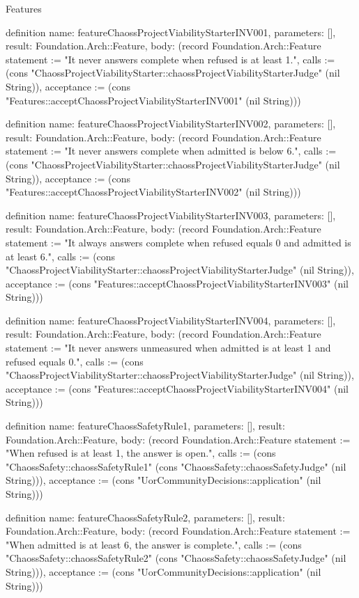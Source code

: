\begin{lexlean}{Features}
\begin{semanticmodule}
definition{
  name: featureChaossProjectViabilityStarterINV001,
  parameters: [],
  result: Foundation.Arch::Feature,
  body: (record Foundation.Arch::Feature {statement := "It never answers complete when refused is at least 1.", calls := (cons "ChaossProjectViabilityStarter::chaossProjectViabilityStarterJudge" (nil String)), acceptance := (cons "Features::acceptChaossProjectViabilityStarterINV001" (nil String))})
}

definition{
  name: featureChaossProjectViabilityStarterINV002,
  parameters: [],
  result: Foundation.Arch::Feature,
  body: (record Foundation.Arch::Feature {statement := "It never answers complete when admitted is below 6.", calls := (cons "ChaossProjectViabilityStarter::chaossProjectViabilityStarterJudge" (nil String)), acceptance := (cons "Features::acceptChaossProjectViabilityStarterINV002" (nil String))})
}

definition{
  name: featureChaossProjectViabilityStarterINV003,
  parameters: [],
  result: Foundation.Arch::Feature,
  body: (record Foundation.Arch::Feature {statement := "It always answers complete when refused equals 0 and admitted is at least 6.", calls := (cons "ChaossProjectViabilityStarter::chaossProjectViabilityStarterJudge" (nil String)), acceptance := (cons "Features::acceptChaossProjectViabilityStarterINV003" (nil String))})
}

definition{
  name: featureChaossProjectViabilityStarterINV004,
  parameters: [],
  result: Foundation.Arch::Feature,
  body: (record Foundation.Arch::Feature {statement := "It never answers unmeasured when admitted is at least 1 and refused equals 0.", calls := (cons "ChaossProjectViabilityStarter::chaossProjectViabilityStarterJudge" (nil String)), acceptance := (cons "Features::acceptChaossProjectViabilityStarterINV004" (nil String))})
}

definition{
  name: featureChaossSafetyRule1,
  parameters: [],
  result: Foundation.Arch::Feature,
  body: (record Foundation.Arch::Feature {statement := "When refused is at least 1, the answer is open.", calls := (cons "ChaossSafety::chaossSafetyRule1" (cons "ChaossSafety::chaossSafetyJudge" (nil String))), acceptance := (cons "UorCommunityDecisions::application" (nil String))})
}

definition{
  name: featureChaossSafetyRule2,
  parameters: [],
  result: Foundation.Arch::Feature,
  body: (record Foundation.Arch::Feature {statement := "When admitted is at least 6, the answer is complete.", calls := (cons "ChaossSafety::chaossSafetyRule2" (cons "ChaossSafety::chaossSafetyJudge" (nil String))), acceptance := (cons "UorCommunityDecisions::application" (nil String))})
}


\end{semanticmodule}
\end{lexlean}
